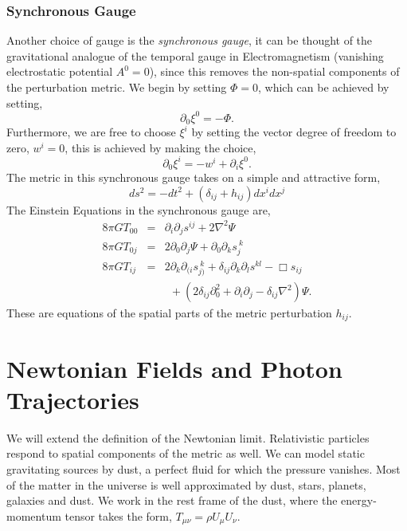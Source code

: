 \subsubsection{Synchronous Gauge}
Another choice of gauge is the \textit{synchronous gauge}, it can be thought of the gravitational analogue of the temporal gauge in Electromagnetism (vanishing electrostatic potential $A^0=0$), since this removes the non-spatial components of the perturbation metric. We begin by setting $\Phi=0$, which can be achieved by setting, 
\begin{equation}
    \partial_0\xi^0=-\Phi.
\end{equation}
Furthermore, we are free to choose $\xi^i$ by setting the vector degree of freedom to zero, $w^i=0$, this is achieved by making the choice, 
\begin{equation}
    \partial_0\xi^i = -w^i + \partial_i\xi^0.
\end{equation}
The metric in this synchronous gauge takes on a simple and attractive form, 
\begin{equation}
    ds^2 = -dt^2 + (\delta_{ij} + h_{ij})dx^{i}dx^{j}\nonumber
\end{equation}
The Einstein Equations in the synchronous gauge are, 
\begin{eqnarray}
    8\pi GT_{00} &=& \partial_i\partial_js^{ij} + 2\nabla^2\Psi\\
    8\pi GT_{0j} &=& 2\partial_0\partial_j\Psi + \partial_0\partial_{k} s_{j}^{\ k}\\
    8\pi GT_{ij} &=& 2\partial_k\partial_{(i}s_{j)}^{\ k} + \delta_{ij}\partial_{k}\partial_{l}s^{kl} - \Box s_{ij}  \nonumber\\
    & & \ \ +\left(2\delta_{ij}\partial_0^2+\partial_i\partial_j-\delta_{ij}\nabla^2\right)\Psi.
\end{eqnarray}
These are equations of the spatial parts of the metric perturbation $h_{ij}$.
\section{Newtonian Fields and Photon Trajectories}
We will extend the definition of the Newtonian limit. Relativistic particles respond to spatial components of the metric as well. We can model static gravitating sources by dust, a perfect fluid for which the pressure vanishes. Most of the matter in the universe is well approximated by dust, stars, planets, galaxies and dust. We work in the rest frame of the dust, where the energy-momentum tensor takes the form, $T_{\mu\nu} = \rho U_{\mu}U_{\nu}$. 

